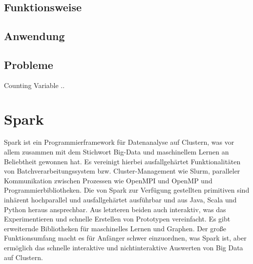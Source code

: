 \documentclass[german,bibnum,beleg,zihtitle,german,hyperref,utf8]{zihpub}
\begin{document}
\section{Funktionsweise}

\section{Anwendung}

\section{Probleme}
Counting Variable ..

\chapter{Spark}
\label{sct:spark}

Spark ist ein Programmierframework für Datenanalyse auf Clustern, was vor allem zusammen mit dem Stichwort Big-Data und maschinellem Lernen an Beliebtheit gewonnen hat. Es vereinigt hierbei ausfallgehärtet Funktionalitäten von Batchverarbeitungssystem bzw. Cluster-Management wie Slurm, paralleler Kommunikation zwischen Prozessen wie OpenMPI und OpenMP und Programmierbibliotheken. Die von Spark zur Verfügung gestellten primitiven sind inhärent hochparallel und ausfallgehärtet ausführbar und aus Java, Scala und Python heraus ansprechbar. Aus letzteren beiden auch interaktiv, was das Experimentieren und schnelle Erstellen von Prototypen vereinfacht. Es gibt erweiternde Bibliotheken für maschinelles Lernen und Graphen. Der große Funktionsumfang macht es für Anfänger schwer einzuordnen, was Spark ist, aber ermöglich das schnelle interaktive und nichtinteraktive Auswerten von Big Data auf Clustern.

%
%
%
\end{document}
